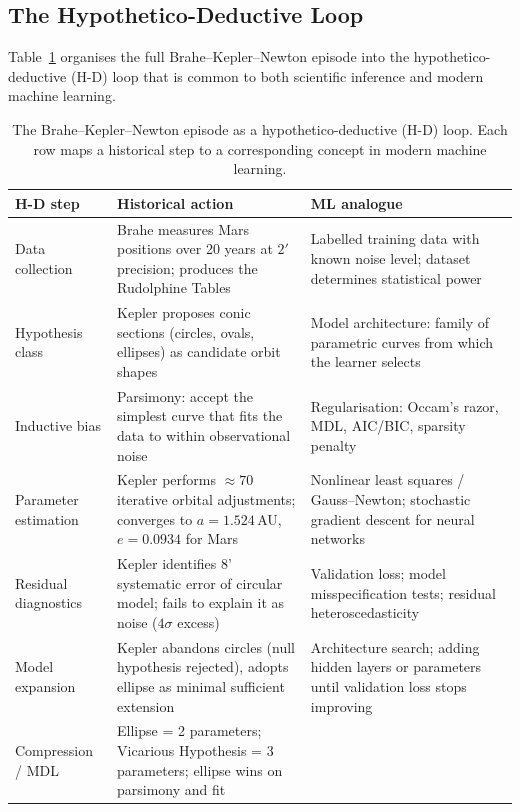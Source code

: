 \documentclass[12pt]{article}
\begin{document}
\subsection{The Hypothetico-Deductive Loop}

Table~\ref{tab:hdloop} organises the full Brahe--Kepler--Newton episode
into the hypothetico-deductive (H-D) loop
that is common to both scientific inference and modern machine learning.

\begin{table}[htbp]
\centering
\small
\renewcommand{\arraystretch}{1.2}
\caption{The Brahe--Kepler--Newton episode as a hypothetico-deductive
  (H-D) loop.  Each row maps a historical step to a corresponding concept
  in modern machine learning.}
\label{tab:hdloop}
\begin{tabular}{@{}p{3.8cm}p{5.0cm}p{5.0cm}@{}}
\toprule
\textbf{H-D step} & \textbf{Historical action} & \textbf{ML analogue} \\
\midrule
Data collection &
  Brahe measures Mars positions over 20 years at $2'$ precision;
  produces the Rudolphine Tables &
  Labelled training data with known noise level; dataset
  determines statistical power \\
Hypothesis class &
  Kepler proposes conic sections (circles, ovals, ellipses) as
  candidate orbit shapes &
  Model architecture: family of parametric curves from which the
  learner selects \\
Inductive bias &
  Parsimony: accept the simplest curve that fits the data to
  within observational noise &
  Regularisation: Occam's razor, MDL, AIC/BIC, sparsity penalty \\
Parameter estimation &
  Kepler performs $\approx70$ iterative orbital adjustments;
  converges to $a=1.524$\,AU, $e=0.0934$ for Mars &
  Nonlinear least squares / Gauss--Newton; stochastic gradient
  descent for neural networks \\
Residual diagnostics &
  Kepler identifies 8' systematic error of circular model;
  fails to explain it as noise ($4\sigma$ excess) &
  Validation loss; model misspecification tests;
  residual heteroscedasticity \\
Model expansion &
  Kepler abandons circles (null hypothesis rejected),
  adopts ellipse as minimal sufficient extension &
  Architecture search; adding hidden layers or
  parameters until validation loss stops improving \\
Compression / MDL &
  Ellipse = 2 parameters; Vicarious Hypothesis = 3 parameters;
  ellipse wins on parsimony and fit &

\end{tabular}
\end{table}
\end{document}
